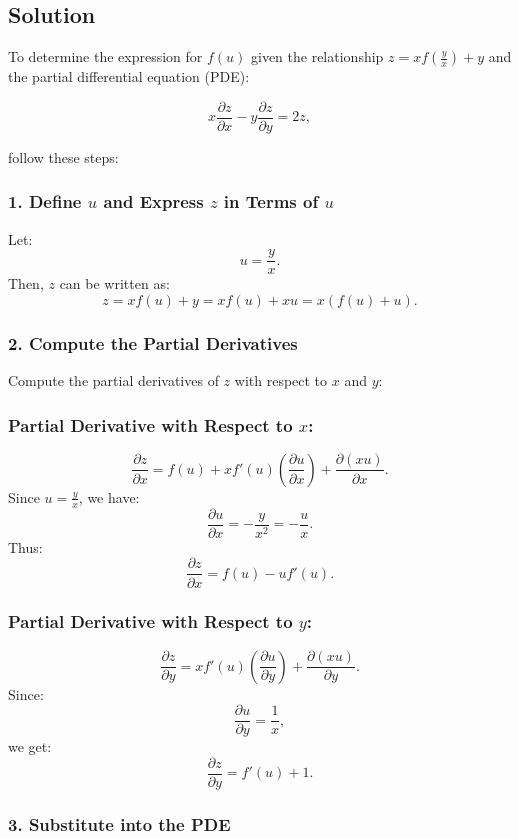 \documentclass[a4paper,12pt]{book}
\begin{document}
\subsection{Solution}

To determine the expression for \( f(u) \) given the relationship \( z = x f\left(\frac{y}{x}\right) + y \) and the partial differential equation (PDE):

\[
x \frac{\partial z}{\partial x} - y \frac{\partial z}{\partial y} = 2z,
\]

follow these steps:

\subsubsection{1. Define \( u \) and Express \( z \) in Terms of \( u \)}

Let:
\[
u = \frac{y}{x}.
\]
Then, \( z \) can be written as:
\[
z = x f(u) + y = x f(u) + x u = x \left( f(u) + u \right).
\]

\subsubsection{2. Compute the Partial Derivatives}

Compute the partial derivatives of \( z \) with respect to \( x \) and \( y \):

\subsubsection{Partial Derivative with Respect to \( x \):}

\[
\frac{\partial z}{\partial x} = f(u) + x f'(u) \left( \frac{\partial u}{\partial x} \right) + \frac{\partial (x u)}{\partial x}.
\]
Since \( u = \frac{y}{x} \), we have:
\[
\frac{\partial u}{\partial x} = -\frac{y}{x^2} = -\frac{u}{x}.
\]
Thus:
\[
\frac{\partial z}{\partial x} = f(u) - u f'(u).
\]

\subsubsection{Partial Derivative with Respect to \( y \):}

\[
\frac{\partial z}{\partial y} = x f'(u) \left( \frac{\partial u}{\partial y} \right) + \frac{\partial (x u)}{\partial y}.
\]
Since:
\[
\frac{\partial u}{\partial y} = \frac{1}{x},
\]
we get:
\[
\frac{\partial z}{\partial y} = f'(u) + 1.
\]

\subsubsection{3. Substitute into the PDE}
\end{document}
